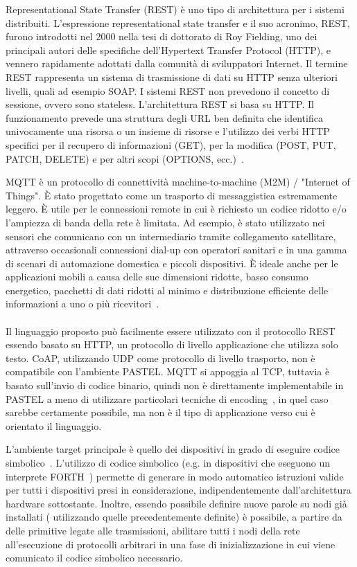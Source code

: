 \documentclass[10pt]{article}
\begin{document}
Representational State Transfer (REST) è uno tipo di architettura per i sistemi distribuiti. L'espressione representational state transfer e il suo acronimo, REST, furono introdotti nel 2000 nella tesi di dottorato di Roy Fielding, uno dei principali autori delle specifiche dell'Hypertext Transfer Protocol (HTTP), e vennero rapidamente adottati dalla comunità di sviluppatori Internet.
Il termine REST rappresenta un sistema di trasmissione di dati su HTTP senza ulteriori livelli, quali ad esempio SOAP. I sistemi REST non prevedono il concetto di sessione, ovvero sono stateless.
L'architettura REST si basa su HTTP. Il funzionamento prevede una struttura degli URL ben definita che identifica univocamente una risorsa o un insieme di risorse e l'utilizzo dei verbi HTTP specifici per il recupero di informazioni (GET), per la modifica (POST, PUT, PATCH, DELETE) e per altri scopi (OPTIONS, ecc.)~\cite{fielding2000architectural}.

MQTT è un protocollo di connettività machine-to-machine (M2M) / "Internet of Things". È stato progettato come un trasporto di messaggistica estremamente leggero. È utile per le connessioni  remote in cui è richiesto un codice ridotto e/o l'ampiezza di banda della rete è limitata. Ad esempio, è stato utilizzato nei sensori che comunicano con un intermediario tramite collegamento satellitare, attraverso occasionali connessioni dial-up con operatori sanitari e in una gamma di scenari di automazione domestica e piccoli dispositivi. È ideale anche per le applicazioni mobili a causa delle sue dimensioni ridotte, basso consumo energetico, pacchetti di dati ridotti al minimo e distribuzione efficiente delle informazioni a uno o più ricevitori~\cite{banks2019mqtt}.\\\\



Il linguaggio proposto può facilmente essere utilizzato con il protocollo REST essendo basato su HTTP, un protocollo di livello applicazione che utilizza solo testo. CoAP, utilizzando UDP come protocollo di livello trasporto, non è compatibile con l'ambiente PASTEL. MQTT si appoggia al TCP, tuttavia è basato sull'invio di codice binario, quindi non è direttamente implementabile in PASTEL a meno di utilizzare particolari tecniche di encoding~\cite{josefsson2006base16}, in quel caso sarebbe certamente possibile, ma non è il tipo di applicazione verso cui è orientato il linguaggio.

L'ambiente target principale è quello dei dispositivi in grado di eseguire codice simbolico~\cite{gaglio2017dc4cd}. L'utilizzo di codice simbolico (e.g. in dispositivi che eseguono un interprete FORTH~\cite{brodie2004thinking}) permette di generare in modo automatico istruzioni valide per tutti i dispositivi presi in considerazione, indipendentemente dall'architettura hardware sottostante.
Inoltre, essendo possibile definire nuove parole su nodi già installati ( utilizzando quelle precedentemente definite) è possibile, a partire da delle primitive legate alle trasmissioni, abilitare tutti i nodi della rete all'esecuzione di protocolli arbitrari in una fase di inizializzazione in cui viene comunicato il codice simbolico necessario. 
\end{document}
